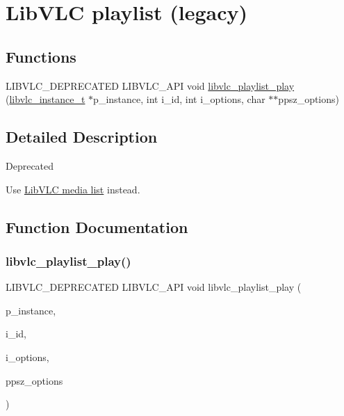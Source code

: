 \hypertarget{group__libvlc__playlist}{}\section{Lib\+V\+LC playlist (legacy)}
\label{group__libvlc__playlist}
\subsection*{Functions}
\begin{DoxyCompactItemize}
\item 
L\+I\+B\+V\+L\+C\+\_\+\+D\+E\+P\+R\+E\+C\+A\+T\+ED L\+I\+B\+V\+L\+C\+\_\+\+A\+PI void \hyperlink{group__libvlc__playlist_ga6382c543b2a88894cb7bfc4e2f9fbe74}{libvlc\+\_\+playlist\+\_\+play} (\hyperlink{group__libvlc__core_ga316d739a80da4678206c79f4d6c2e284}{libvlc\+\_\+instance\+\_\+t} $\ast$p\+\_\+instance, int i\+\_\+id, int i\+\_\+options, char $\ast$$\ast$ppsz\+\_\+options)
\end{DoxyCompactItemize}


\subsection{Detailed Description}
\begin{DoxyRefDesc}{Deprecated}
\item[\hyperlink{deprecated__deprecated000053}{Deprecated}]Use \hyperlink{group__libvlc__media__list}{Lib\+V\+LC media list} instead.\end{DoxyRefDesc}


\subsection{Function Documentation}
\mbox{\label{group__libvlc__playlist_ga6382c543b2a88894cb7bfc4e2f9fbe74}} 
\subsubsection{\texorpdfstring{libvlc\+\_\+playlist\+\_\+play()}{libvlc\_playlist\_play()}}
{\footnotesize\ttfamily L\+I\+B\+V\+L\+C\+\_\+\+D\+E\+P\+R\+E\+C\+A\+T\+ED L\+I\+B\+V\+L\+C\+\_\+\+A\+PI void libvlc\+\_\+playlist\+\_\+play (\begin{DoxyParamCaption}\item[{\hyperlink{group__libvlc__core_ga316d739a80da4678206c79f4d6c2e284}{libvlc\+\_\+instance\+\_\+t} $\ast$}]{p\+\_\+instance,  }\item[{int}]{i\+\_\+id,  }\item[{int}]{i\+\_\+options,  }\item[{char $\ast$$\ast$}]{ppsz\+\_\+options }\end{DoxyParamCaption})}


